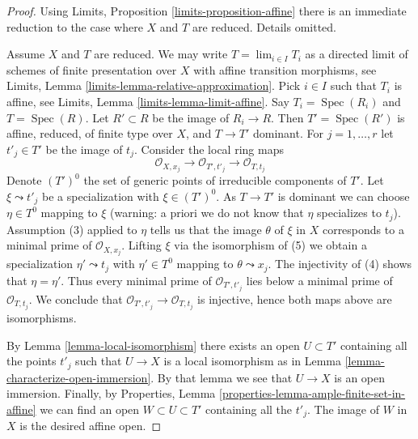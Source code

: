 \documentclass[10pt,a4paper]{amsart}
\theoremstyle{plain}
\theoremstyle{definition}
\theoremstyle{remark}
\numberwithin{equation}{subsection}
\def\lim{\mathop{\mathrm{lim}}\nolimits}
\def\Spec{\mathop{\mathrm{Spec}}}
\begin{document}
\begin{proof}
Using Limits, Proposition \ref{limits-proposition-affine}
there is an immediate reduction to the case where $X$ and $T$ are reduced.
Details omitted.

\medskip\noindent
Assume $X$ and $T$ are reduced. We may write $T = \lim_{i \in I} T_i$
as a directed limit of schemes of finite presentation over $X$
with affine transition morphisms, see
Limits, Lemma \ref{limits-lemma-relative-approximation}.
Pick $i \in I$ such that $T_i$ is affine, see
Limits, Lemma \ref{limits-lemma-limit-affine}.
Say $T_i = \Spec(R_i)$ and $T = \Spec(R)$.
Let $R' \subset R$ be the image of $R_i \to R$.
Then $T' = \Spec(R')$ is affine, reduced, of finite type over $X$,
and $T \to T'$ dominant. For $j = 1, \ldots, r$ let $t'_j \in T'$
be the image of $t_j$. Consider the local ring maps
$$
\mathcal{O}_{X, x_j} \to
\mathcal{O}_{T', t'_j} \to
\mathcal{O}_{T, t_j}
$$
Denote $(T')^0$ the set of generic points of irreducible
components of $T'$. Let $\xi \leadsto t'_j$ be a specialization with
$\xi \in (T')^0$. As $T \to T'$ is dominant we can choose $\eta \in T^0$ 
mapping to $\xi$ (warning: a priori we do not know that $\eta$ specializes
to $t_j$). Assumption (3) applied to $\eta$ tells us that the image $\theta$
of $\xi$ in $X$ corresponds to a minimal prime of $\mathcal{O}_{X, x_j}$.
Lifting $\xi$ via the isomorphism of (5) we obtain a specialization
$\eta' \leadsto t_j$ with $\eta' \in T^0$ mapping to $\theta \leadsto x_j$.
The injectivity of (4) shows that $\eta = \eta'$. Thus
every minimal prime of $\mathcal{O}_{T', t'_j}$ lies below
a minimal prime of $\mathcal{O}_{T, t_j}$. We conclude that
$\mathcal{O}_{T', t'_j} \to \mathcal{O}_{T, t_j}$ is injective,
hence both maps above are isomorphisms.

\medskip\noindent
By Lemma \ref{lemma-local-isomorphism} there exists an open
$U \subset T'$ containing all the points $t'_j$ such that
$U \to X$ is a local isomorphism as in
Lemma \ref{lemma-characterize-open-immersion}.
By that lemma we see that $U \to X$ is an open immersion.
Finally, by
Properties, Lemma \ref{properties-lemma-ample-finite-set-in-affine}
we can find an open $W \subset U \subset T'$
containing all the $t'_j$. The image of $W$ in $X$ is the
desired affine open.
\end{proof}
\end{document}
